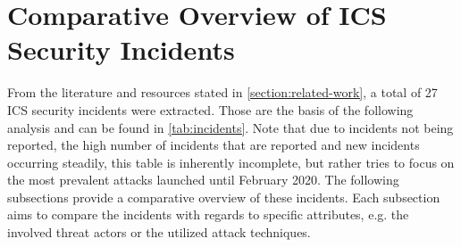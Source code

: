 \documentclass[runningheads]{llncs}
\begin{document}
\section{Comparative Overview of ICS Security Incidents}
\label{section:overview}
From the literature and resources stated in \autoref{section:related-work}, a total of 27 ICS security incidents were extracted.
Those are the basis of the following analysis and can be found in \autoref{tab:incidents}.
Note that due to incidents not being reported, the high number of incidents that are reported and new incidents occurring steadily, this table is inherently incomplete, but rather tries to focus on the most prevalent attacks launched until February 2020.
The following subsections provide a comparative overview of these incidents.
Each subsection aims to compare the incidents with regards to specific attributes, e.g. the involved threat actors or the utilized attack techniques.
\end{document}
